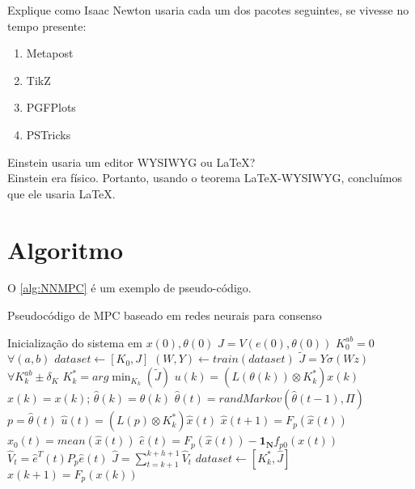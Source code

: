 \begin{exercise}\label{exc:in}
    Explique como Isaac Newton usaria cada um dos pacotes seguintes, se vivesse no tempo presente:
    \begin{enumerate}[label=(\alph*)]
        \item Metapost
        \item TikZ
        \item PGFPlots
        \item PSTricks
    \end{enumerate}
\end{exercise}

\begin{example}\label{exp:ae}
    Einstein usaria um editor WYSIWYG ou \LaTeX? \\
    Einstein era físico. Portanto, usando o teorema LaTeX-WYSIWYG, concluímos que ele usaria \LaTeX.
\end{example}

\section{Algoritmo}

O \cref{alg:NNMPC} é um exemplo de pseudo-código.

\begin{algorithm}[htb]
\caption{Pseudocódigo de MPC baseado em redes neurais para consenso}
\label{alg:NNMPC}
\begin{algorithmic}[1] %
    \State Inicialização do sistema em $x(0), \theta(0)$
    \State $J = V(e(0),\theta(0))$
    \State $K^{ab}_0 = 0$ $\forall (a,b)$
    \State $dataset \gets [K_0,J]$
     
        \State $(W,Y) \gets train(dataset)$
        \State $\tilde{J} = Y\sigma(Wz)$ $\forall K^{ab}_k\pm \delta_K$
        \State $K_k^{\ast} = arg \min_{K_k}(\tilde{J})$
        \State $u(k) =  \left( L(\theta(k)) \otimes K_k^{\ast} \right) x(k)$
        \State $\hat{x}(k) = x(k)$; $\hat{\theta}(k) = \theta(k)$
         
            \State $\hat{\theta}(t) = randMarkov(\hat{\theta}(t-1),\Pi)$
             \State $p = \hat{\theta}(t)$
            \State $\hat{u}(t) = \left( L(p) \otimes K_k^{\ast} \right) \hat{x}(t)$
            \State $\hat{x}(t+1) = F_{p}(\hat{x}(t))$
            \State $x_0(t) = mean(\hat{x}(t))$
            \State $\hat{e}(t) = F_{p}(\hat{x}(t)) - \boldsymbol{1_N} f_{p0}(x(t)) $
            \State $\hat{V}_{t} = \hat{e}^T(t)P_{p}\hat{e}(t)$
            \EndFor
        \State $\hat{J} = \sum_{t = k+1}^{k+h+1} \hat{V}_{t}$
        \State $dataset \gets [K^{\ast}_k,\hat{J}]$
        \State $x(k+1) = F_{p}(x(k))$
    \EndFor
\end{algorithmic}
\end{algorithm}


